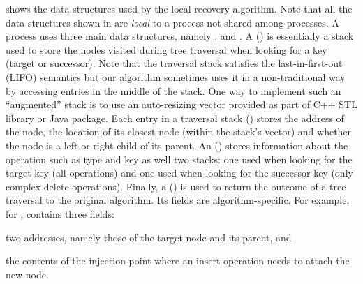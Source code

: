  shows the data structures used by the local recovery algorithm. Note that all the data structures shown in  are \emph{local} to a process not shared among processes. A process uses three main data structures, namely \TraversalRecord{}, \OpRecord{} and \SeekRecord{}. A \TraversalRecord{} () is essentially a stack used to store the nodes visited during tree traversal when looking for a key (target or successor). Note that the traversal stack satisfies the last-in-first-out (LIFO) semantics but our algorithm sometimes uses it in a non-traditional way by accessing entries in the middle of the stack. One way to implement such an ``augmented'' stack is to use an auto-resizing vector provided as part of C++ STL library or Java package. Each entry in a traversal stack () stores the address of the node, the location of its closest \myanchor{} node (within the stack's vector) and whether the node is a left or right child of its parent. An \OpRecord{} () stores information about the operation such as type and key as well two stacks: one used when looking for the target key (all operations) and one used when looking for the successor key (only complex delete operations). Finally, a \SeekRecord{} () is used to return the outcome of a tree traversal to the original algorithm. Its fields are algorithm-specific. For example, for \CASTLE{}, \SeekRecord{} contains three fields: 
\begin{enumerate*}[label=(\alph*)]
\item two addresses, namely those of the target node and its parent, and
\item the contents of the injection point where an insert operation needs to attach the new node. 
\end{enumerate*}


